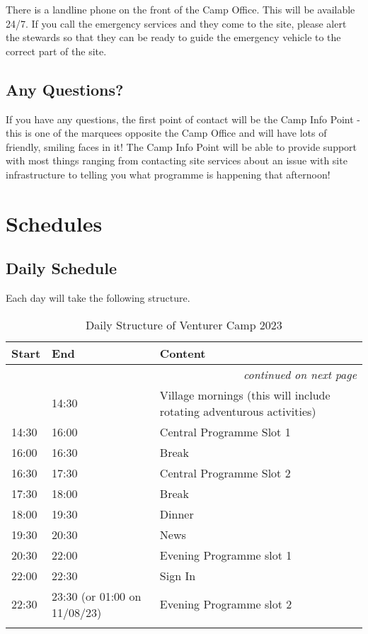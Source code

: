 \documentclass[a4paper, 11pt]{report}
\begin{document}
There is a landline phone on the front of the Camp Office. This will be available 24/7. \nl
If you call the emergency services and they come to the site, please alert the stewards so that they can be ready to guide the emergency vehicle to the correct part of the site. 

\section{Any Questions?}
If you have any questions, the first point of contact will be the Camp Info Point - this is one of the marquees opposite the Camp Office and will have lots of friendly, smiling faces in it!\nl
The Camp Info Point will be able to provide support with most things ranging from contacting site services about an issue with site infrastructure to telling you what programme is happening that afternoon!

\chapter{Schedules}
\section{Daily Schedule}
Each day will take the following structure.

{\RaggedRight \centering
\begin{longtable}{p{} p{} p{}}
\textbf{Start} & \textbf{End} & \textbf{Content} \\ 
\hline
\endhead

\multicolumn{3}{r}{\footnotesize\itshape continued on next page}\\
\endfoot 

\endlastfoot

& 14:30 & Village mornings (this will include rotating adventurous activities) \\ 
\hline
14:30 & 16:00 & Central Programme Slot 1 \\ 
\hline
16:00 & 16:30 & Break \\ 
\hline
16:30 & 17:30 & Central Programme Slot 2 \\ 
\hline
17:30 & 18:00 & Break \\ 
\hline
18:00 & 19:30 & Dinner \\ 
\hline
19:30 & 20:30 & News \\ 
\hline
20:30 & 22:00 & Evening Programme slot 1 \\ 
\hline
22:00 & 22:30 & Sign In \\ 
\hline
22:30 & 23:30 (or 01:00 on 11/08/23) & Evening Programme slot 2 \\ 
\hline

\caption{Daily Structure of Venturer Camp 2023}
\end{longtable}
}%
\end{document}
